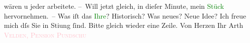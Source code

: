                     wären u jeder arbeitete.\pend
           \pstart
           – Will jetzt gleich, in dieſer Minute, mein \textcolor{green}{Stück}{} hervornehmen. – Was iſt das \textcolor{green}{Ihre}{}? Historisch? Was neues?
                    Neue Idee? Ich freue mich dſs Sie in Sti{\geminationm}ung ſind.
                    Bitte gleich wieder eine Zeile.\pend
           \pstart Von Herzen Ihr \spacefill\mbox{Arth}\pend{}\pstart
           \noindent{}\textcolor{pink}{\textsc{Velden, Pension
                                Pundschu}}{}\ledrightnote{\textcolor{pink}{Pension Pundschu}}\pend
           \endnumbering{}  
      